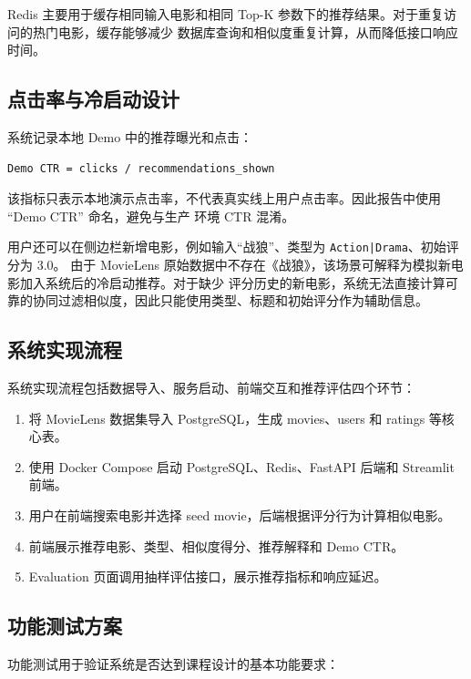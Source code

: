 Redis 主要用于缓存相同输入电影和相同 Top-K 参数下的推荐结果。对于重复访问的热门电影，缓存能够减少
数据库查询和相似度重复计算，从而降低接口响应时间。

\subsection{点击率与冷启动设计}

系统记录本地 Demo 中的推荐曝光和点击：

\begin{verbatim}
Demo CTR = clicks / recommendations_shown
\end{verbatim}

该指标只表示本地演示点击率，不代表真实线上用户点击率。因此报告中使用 ``Demo CTR'' 命名，避免与生产
环境 CTR 混淆。

用户还可以在侧边栏新增电影，例如输入``战狼''、类型为 \texttt{Action|Drama}、初始评分为 3.0。
由于 MovieLens 原始数据中不存在《战狼》，该场景可解释为模拟新电影加入系统后的冷启动推荐。对于缺少
评分历史的新电影，系统无法直接计算可靠的协同过滤相似度，因此只能使用类型、标题和初始评分作为辅助信息。

\subsection{系统实现流程}

系统实现流程包括数据导入、服务启动、前端交互和推荐评估四个环节：

\begin{enumerate}[leftmargin=2em]
  \item 将 MovieLens 数据集导入 PostgreSQL，生成 movies、users 和 ratings 等核心表。
  \item 使用 Docker Compose 启动 PostgreSQL、Redis、FastAPI 后端和 Streamlit 前端。
  \item 用户在前端搜索电影并选择 seed movie，后端根据评分行为计算相似电影。
  \item 前端展示推荐电影、类型、相似度得分、推荐解释和 Demo CTR。
  \item Evaluation 页面调用抽样评估接口，展示推荐指标和响应延迟。
\end{enumerate}

\subsection{功能测试方案}

功能测试用于验证系统是否达到课程设计的基本功能要求：

